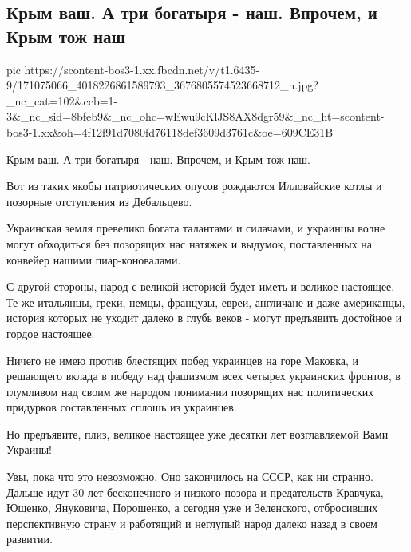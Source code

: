  
 
 
 
 

\subsection{Крым ваш. А три богатыря - наш. Впрочем, и Крым тож наш}
\label{sec:10_04_2021.fb.mischishin_mihail.1.bogatyri_krym_ukraina}

\ifcmt
  pic https://scontent-bos3-1.xx.fbcdn.net/v/t1.6435-9/171075066_4018226861589793_3676805574523668712_n.jpg?_nc_cat=102&ccb=1-3&_nc_sid=8bfeb9&_nc_ohc=wEwu9cKlJS8AX8dgr59&_nc_ht=scontent-bos3-1.xx&oh=4f12f91d7080fd76118def3609d3761c&oe=609CE31B
\fi

Крым ваш. А три богатыря - наш. Впрочем, и Крым тож наш.

Вот из таких якобы патриотических опусов рождаются Илловайские котлы и позорные отступления из Дебальцево.

Украинская земля  превелико богата талантами и силачами, и украинцы волне могут
обходиться без позорящих нас натяжек и выдумок, поставленных на конвейер нашими
пиар-коновалами.

С другой стороны, народ с великой историей будет иметь и великое настоящее. Те
же итальянцы, греки, немцы, французы, евреи, англичане и даже американцы,
история которых не уходит далеко в глубь веков - могут предъявить достойное и
гордое настоящее.

Ничего не имею против блестящих побед украинцев на горе Маковка, и решающего
вклада в победу над фашизмом всех четырех украинских фронтов, в глумливом над
своим же народом понимании позорящих нас политических придурков составленных
сплошь из украинцев.

Но предъявите, плиз, великое настоящее уже десятки лет возглавляемой Вами Украины!

Увы, пока что это невозможно. Оно закончилось на СССР, как ни странно. Дальше
идут 30 лет бесконечного и низкого позора и предательств Кравчука, Ющенко,
Януковича, Порошенко, а сегодня уже и Зеленского, отбросивших перспективную
страну и работящий и неглупый народ далеко назад в своем развитии.

